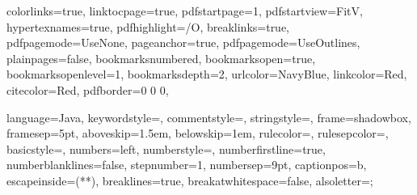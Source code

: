 \graphicspath{{figures/}{../figures/}}

\hypersetup %
{
	colorlinks=true,
	linktocpage=true, 
	pdfstartpage=1,
	pdfstartview=FitV,
	hypertexnames=true,
	pdfhighlight=/O,
	breaklinks=true,
	pdfpagemode=UseNone,
	pageanchor=true,
	pdfpagemode=UseOutlines,
	plainpages=false,
	bookmarksnumbered,
	bookmarksopen=true,
	bookmarksopenlevel=1,
	bookmarksdepth=2,
	urlcolor=NavyBlue,
	linkcolor=Red,
	citecolor=Red,
	pdfborder={0 0 0},
}

\lstset %
{
	language=Java,
	keywordstyle=\color{RoyalBlue},
    commentstyle=\color{Green}\ttfamily,
    stringstyle=\color{Red}\ttfamily,
	frame=shadowbox,
	framesep=5pt,
	aboveskip=1.5em,
	belowskip=1em,
	rulecolor=\color{blue!40!black},
	rulesepcolor=\color{white!93!black},
	basicstyle=\ttfamily\small,
	numbers=left,
	numberstyle=\tiny,
	numberfirstline=true,
	numberblanklines=false,
	stepnumber=1,
	numbersep=9pt,	
	captionpos=b,
	escapeinside={(*}{*)},
	breaklines=true,
	breakatwhitespace=false,
	alsoletter={;}
}

\usetikzlibrary{positioning,fit,calc,shapes,arrows,external,petri}

